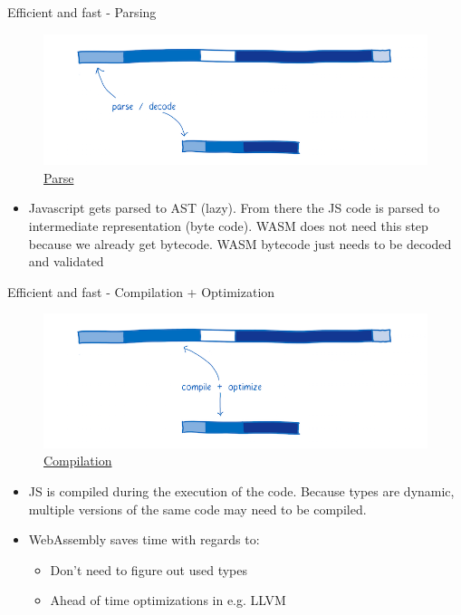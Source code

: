 \documentclass{beamer}
\begin{document}
\begin{frame}{Efficient and fast - Parsing}
      \begin{figure}
        \includegraphics[scale=0.2]{./images/pasedecode.png}
        \caption{\href{https://www.smashingmagazine.com/2017/05/abridged-cartoon-introduction-webassembly/}{Parse}}
    \end{figure}
\begin{itemize}
    \item Javascript gets parsed to AST (lazy). From there the JS code is parsed to intermediate representation (byte code). WASM does not need this step because we already get bytecode. WASM bytecode just needs to be decoded and validated
\end{itemize}
\end{frame}

\begin{frame}{Efficient and fast - Compilation + Optimization}
      \begin{figure}
        \includegraphics[scale=0.2]{./images/copyoptimize.png}
        \caption{\href{https://www.smashingmagazine.com/2017/05/abridged-cartoon-introduction-webassembly/}{Compilation}}
    \end{figure}
\begin{itemize}
    \item JS is compiled during the execution of the code. Because types are dynamic, multiple versions of the same code may need to be compiled. 
    \item WebAssembly saves time with regards to: 
    \begin{itemize}
       \item Don't need to figure out used types
       \item Ahead of time optimizations in e.g. LLVM 
    \end{itemize}
\end{itemize}
\end{frame}
\end{document}
